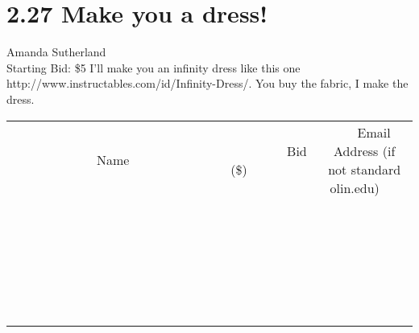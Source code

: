 \documentclass[11pt]{article}
\begin{document}
\section*{2.27 Make you a dress!}
Amanda Sutherland
\\
Starting Bid: \$5
\newline
I'll make you an infinity dress like this one http://www.instructables.com/id/Infinity-Dress/. You buy the fabric, I make the dress.
\\[6ex]
\begin{tabular}{c c c}
~~~~~~~~~~~~~Name~~~~~~~~~~~~~ & ~~~~~~~~~Bid (\$)~~~~~~~~~  & ~~~Email Address (if not standard olin.edu)~~~\\
 & & \\
\hline
 & & \\
\hline
 & & \\
\hline
 & & \\
\hline
 & & \\
\hline
 & & \\
\hline
 & & \\
\hline
 & & \\
\hline
 & & \\
\hline
 & & \\
\hline
 & & \\
\hline
 & & \\
\hline
 & & \\
\hline
 & & \\
\hline
 & & \\
\hline
 & & \\
\hline
 & & \\
\hline
 & & \\
\hline
 & & \\
\hline
 & & \\
\hline
 & & \\
\hline
 & & \\
\hline
 & & \\
\hline
 & & \\
\hline
 & & \\
\hline
 & & \\
\hline
\end{tabular}
\newpage
\end{document}
